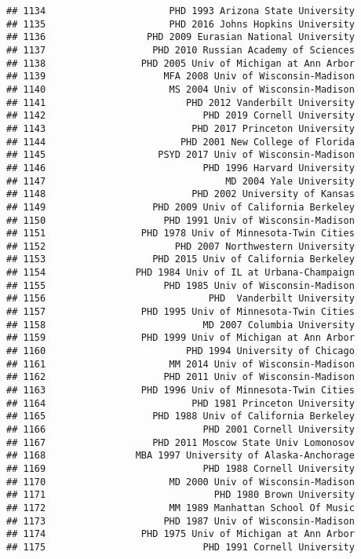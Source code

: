 \documentclass[
]{article}
\begin{document}
\begin{verbatim}
## 1134                      PHD 1993 Arizona State University
## 1135                      PHD 2016 Johns Hopkins University
## 1136                  PHD 2009 Eurasian National University
## 1137                   PHD 2010 Russian Academy of Sciences
## 1138                 PHD 2005 Univ of Michigan at Ann Arbor
## 1139                     MFA 2008 Univ of Wisconsin-Madison
## 1140                      MS 2004 Univ of Wisconsin-Madison
## 1141                         PHD 2012 Vanderbilt University
## 1142                            PHD 2019 Cornell University
## 1143                          PHD 2017 Princeton University
## 1144                        PHD 2001 New College of Florida
## 1145                    PSYD 2017 Univ of Wisconsin-Madison
## 1146                            PHD 1996 Harvard University
## 1147                                MD 2004 Yale University
## 1148                          PHD 2002 University of Kansas
## 1149                   PHD 2009 Univ of California Berkeley
## 1150                     PHD 1991 Univ of Wisconsin-Madison
## 1151                 PHD 1978 Univ of Minnesota-Twin Cities
## 1152                       PHD 2007 Northwestern University
## 1153                   PHD 2015 Univ of California Berkeley
## 1154                PHD 1984 Univ of IL at Urbana-Champaign
## 1155                     PHD 1985 Univ of Wisconsin-Madison
## 1156                             PHD  Vanderbilt University
## 1157                 PHD 1995 Univ of Minnesota-Twin Cities
## 1158                            MD 2007 Columbia University
## 1159                 PHD 1999 Univ of Michigan at Ann Arbor
## 1160                         PHD 1994 University of Chicago
## 1161                      MM 2014 Univ of Wisconsin-Madison
## 1162                     PHD 2011 Univ of Wisconsin-Madison
## 1163                 PHD 1996 Univ of Minnesota-Twin Cities
## 1164                          PHD 1981 Princeton University
## 1165                   PHD 1988 Univ of California Berkeley
## 1166                            PHD 2001 Cornell University
## 1167                   PHD 2011 Moscow State Univ Lomonosov
## 1168                MBA 1997 University of Alaska-Anchorage
## 1169                            PHD 1988 Cornell University
## 1170                      MD 2000 Univ of Wisconsin-Madison
## 1171                              PHD 1980 Brown University
## 1172                      MM 1989 Manhattan School Of Music
## 1173                     PHD 1987 Univ of Wisconsin-Madison
## 1174                 PHD 1975 Univ of Michigan at Ann Arbor
## 1175                            PHD 1991 Cornell University

\end{verbatim}
\end{document}
